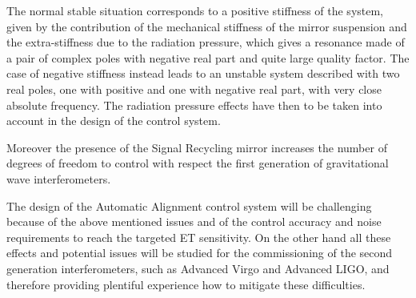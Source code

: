 The normal stable situation corresponds to a positive stiffness of the system, given by the contribution of the mechanical 
stiffness of the mirror suspension and the extra-stiffness due to the radiation pressure, which gives a resonance made of
 a pair of complex poles with negative real part and quite large quality factor. The case of negative stiffness instead leads
 to an unstable system described with two real poles, one with positive and one with negative real part, with very close absolute frequency.
The radiation pressure effects have then to be taken into account in the design of the control system.


Moreover the presence of the Signal Recycling mirror increases the number of degrees of freedom to control with respect
 the first generation of gravitational wave interferometers.

The design of the Automatic Alignment control system will be challenging because of the above mentioned issues and of 
the control accuracy and noise requirements to reach the targeted ET sensitivity.
On the other hand all these effects and potential issues will be studied for the commissioning of the second generation 
interferometers, such as Advanced Virgo and Advanced LIGO, and therefore providing plentiful  experience 
how to mitigate these difficulties.

